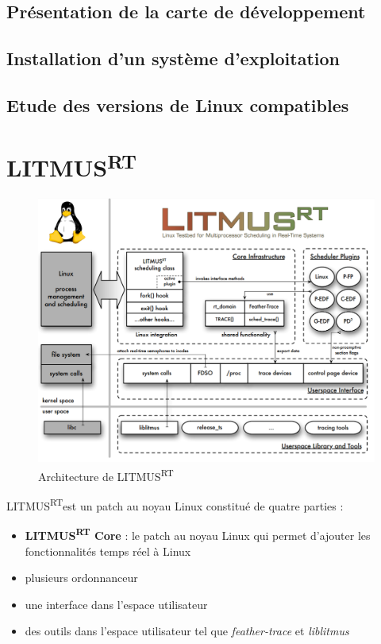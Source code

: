 \documentclass{article}
\newcommand{\litmus}{LITMUS\textsuperscript{RT}}
\begin{document}
    \subsection{Présentation de la carte de développement}
    

    \subsection{Installation d'un système d'exploitation}
    

    \subsection{Etude des versions de Linux compatibles}
    




    
    \newpage
    \section{\litmus}
    \label{section:litmus}
    
\begin{figure}[H]
    \centering
    \includegraphics[width=0.5\paperwidth]{Images/litmusrtarchitecture.png}
    \caption{Architecture de \litmus}
    \label{fig:litmusrtarchitecture}
\end{figure}

    \litmus est un patch au noyau Linux constitué de quatre parties : 
    \begin{itemize}
        \item \textbf{LITMUS\textsuperscript{RT} Core} : le patch au noyau Linux qui permet d'ajouter les fonctionnalités temps réel à Linux
        \item plusieurs \gls{ordonnanceur}
        \item une interface dans l'espace utilisateur
        \item des outils dans l'espace utilisateur tel que \textit{feather-trace} et \textit{liblitmus}
    \end{itemize}
\end{document}
